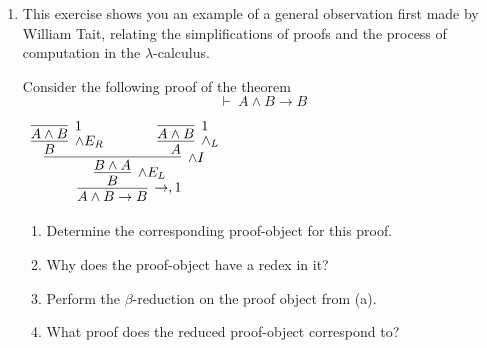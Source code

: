 \documentclass[11pt]{report}
\begin{document}
\begin{enumerate}
	\item This exercise shows you an example of a general observation first made by William Tait, relating the simplifications of proofs and the process of computation in the $\lambda$-calculus. 
	
	Consider the following proof of the theorem $$\vdash \ A \land B \to B$$
	
	\begin{center}
		$\begin{array}{c}		
		  \infer[\to, 1]{A \land B \to B}
		  	{\infer[\land E_{L}]{B}
				{\infer[\land I]{B \land A}
					{\infer[\land E_{R}]{B}{\infer[1]{A \land B}{}} 
					\hspace{0.5cm}	&	\hspace{0.5cm}
					\infer[\land_{L}]{A}{\infer[1]{A \land B}{}}}}}
		\end{array}$
	  \end{center}

	  	\begin{enumerate}
			\item Determine the corresponding proof-object for this proof. 
			\item Why does the proof-object have a redex in it? 
			\item Perform the $\beta$-reduction on the proof object from (a).
			\item What proof does the reduced proof-object correspond to?
		\end{enumerate} 

\end{enumerate}	
\end{document}
